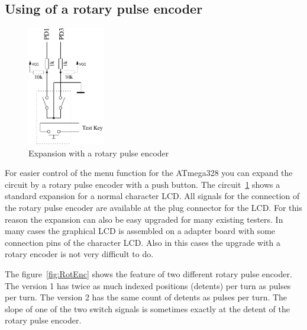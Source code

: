 \subsection{Using of a rotary pulse encoder}

\begin{figure}
\vspace{-0.5\baselineskip}
\begin{center}
\includegraphics[width=0.30\textwidth]{../FIG/rotary_extension.pdf}
\end{center}
\vspace{-0.5\baselineskip}
 \caption{Expansion with a rotary pulse encoder}
\vspace{-0.5\baselineskip}
\label{fig:RotExt}
\end{figure}



For easier control of the menu function for the ATmega328 you can expand the circuit 
by a rotary pulse encoder with a push button.
The circuit~\ref{fig:RotExt} shows a standard expansion for a normal character LCD.
All signals for the connection of the rotary pulse encoder are available at the plug connector
for the LCD. For this reason the expansion can also be easy upgraded for many existing testers.
In many cases the graphical LCD is assembled on a adapter board with some connection pins
of the character LCD. Also in this cases the upgrade with a rotary encoder is not very difficult to do.

The figure~\ref{fig:RotEnc} shows the feature of two different rotary pulse encoder.
The version 1 has twice as much indexed positions (detents) per turn as pulses per turn.
The version 2 has the same count of detents as pulses per turn.
The slope of one of the two switch signals is sometimes exactly at the detent of the 
rotary pulse encoder.


